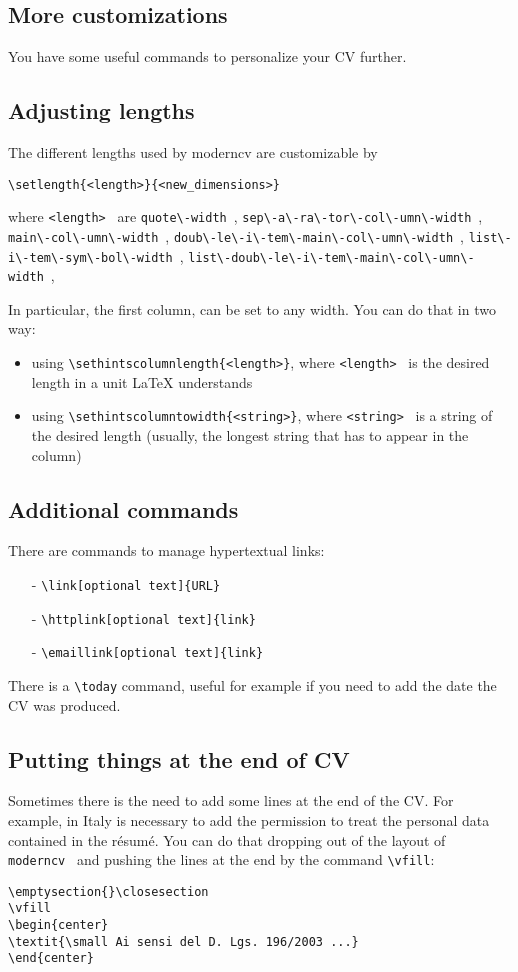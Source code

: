 \documentclass[a4paper,11pt]{article}
\newcommand{\Code}[1]{\lstinline!#1!~} %
\begin{document}
\subsection{More customizations}

You have some useful commands to personalize your CV further.


\subsection*{Adjusting lengths}
The different lengths used by moderncv are customizable by
\begin{verbatim}
\setlength{<length>}{<new_dimensions>}
\end{verbatim}
where \Code{<length>} are \Code{quote\-width}, \Code{sep\-a\-ra\-tor\-col\-umn\-width}, \Code{main\-col\-umn\-width}, \Code{doub\-le\-i\-tem\-main\-col\-umn\-width}, \Code{list\-i\-tem\-sym\-bol\-width}, \Code{list\-doub\-le\-i\-tem\-main\-col\-umn\-width}, 

In particular, the first column, can be set to any width. You can do that in two way:
\begin{itemize}
 \item using \verb|\sethintscolumnlength{<length>}|, where  \Code{<length>} is the desired length in a unit LaTeX understands
 \item using \verb|\sethintscolumntowidth{<string>}|, where \Code{<string>} is a string of the desired length (usually, the longest string that has to appear in the column)
\end{itemize}

\subsection*{Additional commands}
There are commands to manage hypertextual links:
\begin{itemize}
 \item[-] \verb|\link[optional text]{URL}|
 \item[-] \verb|\httplink[optional text]{link}|
 \item[-] \verb|\emaillink[optional text]{link}|
\end{itemize}

There is a \verb|\today| command, useful for example if you need to add the date the CV was produced.

\subsection*{Putting things at the end of CV}
Sometimes there is the need to add some lines at the end of the CV. For example, in Italy is necessary to add the permission to treat the personal data contained in the r\'esum\'e. You can do that dropping out of the layout of \Code{moderncv} and pushing the lines at the end by the command \verb|\vfill|:
\begin{verbatim}
\emptysection{}\closesection
\vfill
\begin{center} 
\textit{\small Ai sensi del D. Lgs. 196/2003 ...}
\end{center}
\end{verbatim}
\end{document}
